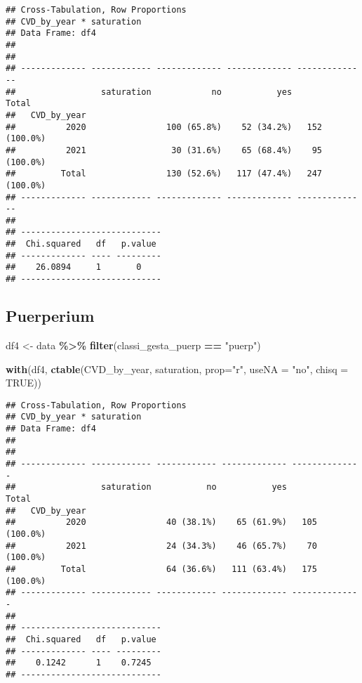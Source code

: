 \documentclass[
]{article}
\newenvironment{Shaded}{\begin{snugshade}}{\end{snugshade}}
\newcommand{\AttributeTok}[1]{\textcolor[rgb]{0.13,0.29,0.53}{#1}}
\newcommand{\ConstantTok}[1]{\textcolor[rgb]{0.56,0.35,0.01}{#1}}
\newcommand{\FunctionTok}[1]{\textcolor[rgb]{0.13,0.29,0.53}{\textbf{#1}}}
\newcommand{\NormalTok}[1]{#1}
\newcommand{\OtherTok}[1]{\textcolor[rgb]{0.56,0.35,0.01}{#1}}
\newcommand{\SpecialCharTok}[1]{\textcolor[rgb]{0.81,0.36,0.00}{\textbf{#1}}}
\newcommand{\StringTok}[1]{\textcolor[rgb]{0.31,0.60,0.02}{#1}}
\begin{document}
\begin{verbatim}
## Cross-Tabulation, Row Proportions  
## CVD_by_year * saturation  
## Data Frame: df4  
## 
## 
## ------------- ------------ ------------- ------------- --------------
##                 saturation            no           yes          Total
##   CVD_by_year                                                        
##          2020                100 (65.8%)    52 (34.2%)   152 (100.0%)
##          2021                 30 (31.6%)    65 (68.4%)    95 (100.0%)
##         Total                130 (52.6%)   117 (47.4%)   247 (100.0%)
## ------------- ------------ ------------- ------------- --------------
## 
## ----------------------------
##  Chi.squared   df   p.value 
## ------------- ---- ---------
##    26.0894     1       0    
## ----------------------------
\end{verbatim}

\hypertarget{puerperium-2}{%
\subsection{Puerperium}\label{puerperium-2}}

\begin{Shaded}
\begin{Highlighting}[]
\NormalTok{df4 }\OtherTok{\textless{}{-}}\NormalTok{ data }\SpecialCharTok{\%\textgreater{}\%} 
  \FunctionTok{filter}\NormalTok{(classi\_gesta\_puerp }\SpecialCharTok{==} \StringTok{"puerp"}\NormalTok{)}

\FunctionTok{with}\NormalTok{(df4, }\FunctionTok{ctable}\NormalTok{(CVD\_by\_year, saturation, }\AttributeTok{prop=}\StringTok{"r"}\NormalTok{, }\AttributeTok{useNA =} \StringTok{"no"}\NormalTok{, }\AttributeTok{chisq =} \ConstantTok{TRUE}\NormalTok{))}
\end{Highlighting}
\end{Shaded}

\begin{verbatim}
## Cross-Tabulation, Row Proportions  
## CVD_by_year * saturation  
## Data Frame: df4  
## 
## 
## ------------- ------------ ------------ ------------- --------------
##                 saturation           no           yes          Total
##   CVD_by_year                                                       
##          2020                40 (38.1%)    65 (61.9%)   105 (100.0%)
##          2021                24 (34.3%)    46 (65.7%)    70 (100.0%)
##         Total                64 (36.6%)   111 (63.4%)   175 (100.0%)
## ------------- ------------ ------------ ------------- --------------
## 
## ----------------------------
##  Chi.squared   df   p.value 
## ------------- ---- ---------
##    0.1242      1    0.7245  
## ----------------------------
\end{verbatim}
\end{document}
